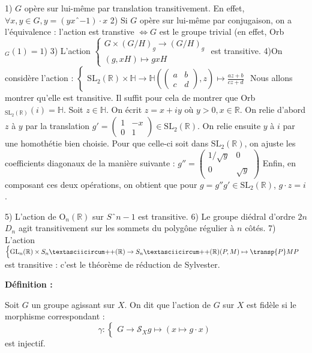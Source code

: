 \documentclass{report}
\newenvironment{definition}[1][]{
    \begin{tcolorbox}[colframe= white]
    \textbf{Définition :} 
    #1 \par
    }
    {\end{tcolorbox}}
\begin{document}
\begin{exemples}
1) $G$ opère sur lui-même par translation transitivement.
En effet, $\forall x,y \in G, y = (yxˆ{-1}) \cdot x$
2) Si $G$ opère sur lui-même par conjugaison, on a l'équivalence : 
l'action est transtive $\Leftrightarrow G$ est le groupe trivial (en effet, Orb$_G (1) = {1}$)
3) L'action $\begin{cases}
G \times (G/H)_g \rightarrow (G/H)_g \\
(g, xH) \mapsto gxH
\end{cases}$ est transitive.
4)On considère l'action : $\begin{cases}
\mathrm{SL}_2 (\mathbb{R}) \times \mathbb{H}  \rightarrow \mathbb{H}
(\begin{pmatrix} 
a & b \\
c & d 
\end{pmatrix}, z) \mapsto \frac{az + b}{cz + d}
\end{cases}$
Nous allons montrer qu'elle est transitive. Il suffit pour cela de montrer que Orb$_{\mathrm{SL}_2 (\mathbb{R})} (i) = \mathbb{H}$.
Soit $z \in \mathbb{H}$. On écrit $z = x + iy$ où $y > 0, x \in \mathbb{R}$.
On relie d'abord $z$ à $y$ par la translation $g' = \begin{pmatrix} 
1 & -x \\
0 & 1 
\end{pmatrix} \in \mathrm{SL}_2 (\mathbb{R})$. On relie ensuite $y$ à $i$ par une homothétie bien choisie. Pour que celle-ci soit dans $\mathrm{SL}_2 (\mathbb{R})$, on ajuste les coefficients diagonaux de la manière suivante :
$g'' = \begin{pmatrix} 
1/\sqrt{y} & 0 \\
0 & \sqrt{y}
\end{pmatrix}$
Enfin, en composant ces deux opérations, on obtient que pour $g = g'' g' \in \mathrm{SL}_2 (\mathbb{R})$, $g\cdot z = i$.

5) L'action de O$_n (\mathbb{R})$ sur $Sˆ{n-1}$ est transitive. 
6) Le groupe diédral d'ordre $2n$ $D_n$ agit transitivement sur les sommets du polygône régulier à $n$ côtés.
7) L'action $\begin{cases}
\mathrm{GL}_n (\mathbb{R}) \times S_nˆ{++}(\mathbb{R}) \rightarrow S_nˆ{++}(\mathbb{R})
(P, M) \mapsto \transp{P} M P
\end{cases}$ est transitive : c'est le théorème de réduction de Sylvester. 
\end{exemples}

\begin{definition}
Soit $G$ un groupe agissant sur $X$. 
On dit que l'action de $G$ sur $X$ est fidèle si le morphisme correspondant : 
$$\gamma : \begin{cases}
G \rightarrow \mathcal{S}_X
g \mapsto (x \mapsto g \cdot x) 
\end{cases} $$
est injectif.
\end{definition}
\end{document}
